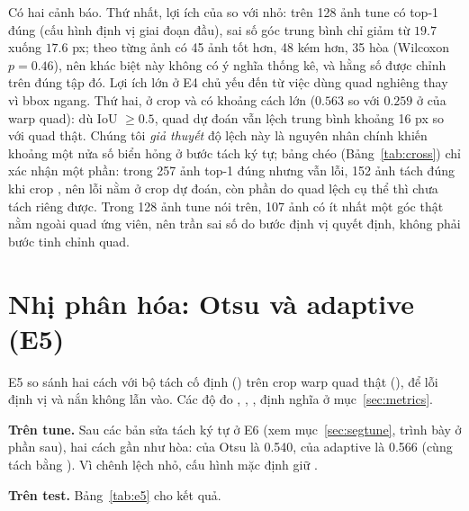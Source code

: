 Có hai cảnh báo. Thứ nhất, lợi ích của  so với  nhỏ: trên 128 ảnh tune có top-1 đúng (cấu hình định vị giai đoạn đầu), sai số góc trung bình chỉ giảm từ $19.7$ xuống $17.6$ px; theo từng ảnh có 45 ảnh tốt hơn, 48 kém hơn, 35 hòa (Wilcoxon $p=0.46$), nên khác biệt này không có ý nghĩa thống kê, và hằng số được chỉnh trên đúng tập đó. Lợi ích lớn ở E4 chủ yếu đến từ việc dùng quad nghiêng thay vì bbox ngang. Thứ hai, ở crop  và  có khoảng cách lớn ($0.563$ so với $0.259$ ở  của warp quad): dù IoU $\ge 0.5$, quad dự đoán vẫn lệch trung bình khoảng 16 px so với quad thật. Chúng tôi \emph{giả thuyết} độ lệch này là nguyên nhân chính khiến khoảng một nửa số biển hỏng ở bước tách ký tự; bảng chéo (Bảng~\ref{tab:cross}) chỉ xác nhận một phần: trong 257 ảnh top-1 đúng nhưng vẫn lỗi, 152 ảnh tách đúng khi crop , nên lỗi nằm ở crop dự đoán, còn phần do quad lệch cụ thể thì chưa tách riêng được. Trong 128 ảnh tune nói trên, 107 ảnh có ít nhất một góc thật nằm ngoài quad ứng viên, nên trần sai số do bước định vị quyết định, không phải bước tinh chỉnh quad.

\section{Nhị phân hóa: Otsu và adaptive (E5)}
\label{sec:e5}

E5 so sánh hai cách với bộ tách cố định () trên crop warp quad thật (), để lỗi định vị và nắn không lẫn vào. Các độ đo , , ,  định nghĩa ở mục~\ref{sec:metrics}.

\textbf{Trên tune.} Sau các bản sửa tách ký tự ở E6 (xem mục~\ref{sec:segtune}, trình bày ở phần sau), hai cách gần như hòa:  của Otsu là 0.540, của adaptive là 0.566 (cùng tách bằng ). Vì chênh lệch nhỏ, cấu hình mặc định giữ .

\textbf{Trên test.} Bảng~\ref{tab:e5} cho kết quả.

